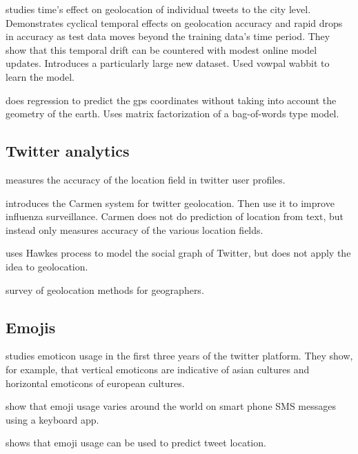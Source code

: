 \documentclass{article}
\begin{document}
\citet{dredze2016geolocation} studies time's effect on geolocation of individual tweets to the city level.
Demonstrates cyclical temporal effects on geolocation accuracy and rapid drops in accuracy as test data moves beyond the training data's time period.
They show that this temporal drift can be countered with modest online model updates.
Introduces a particularly large new dataset.
Used vowpal wabbit to learn the model.

\citet{duong2016near} does regression to predict the gps coordinates without taking into account the geometry of the earth.
Uses matrix factorization of a bag-of-words type model.


\subsection{Twitter analytics}

\citet{hecht2011tweets} measures the accuracy of the location field in twitter user profiles.

\citet{dredze2013carmen} introduces the Carmen system for twitter geolocation.
Then use it to improve influenza surveillance.
Carmen does not do prediction of location from text,
but instead only measures accuracy of the various location fields.

\citet{he2015hawkestopic} uses Hawkes process to model the social graph of Twitter,
but does not apply the idea to geolocation.

\citet{graham2014world} survey of geolocation methods for geographers.


\subsection{Emojis}

\citet{park2013emoticon} studies emoticon usage in the first three years of the twitter platform.
They show, for example, that vertical emoticons are indicative of asian cultures and horizontal emoticons of european cultures.

\citet{lu2016learning} show that emoji usage varies around the world on smart phone SMS messages using a keyboard app.

\citet{ljubevsic2016global} shows that emoji usage can be used to predict tweet location.

\end{document}
